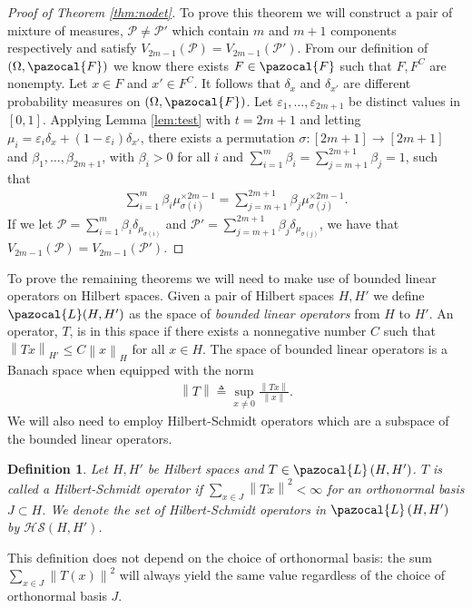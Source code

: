 \documentclass[aos,preprint]{imsart}
\def\l{\left}
\def\r{\right}
\def\sF{\pazocal{F}}
\def\sP{\mathscr{P}}
\def\sL{\pazocal{L}}
\def\hs{\mathscr{HS}}
\theoremstyle{plain}
\theoremstyle{defintion}
\newtheorem{defin}{Definition}[section]
\begin{document}
	\begin{proof}[Proof of Theorem \ref{thm:nodet}]
		To prove this theorem we will construct a pair of mixture of measures, $\sP \neq \sP'$ which contain $m$ and $m+1$ components respectively and satisfy $V_{2m-1}\left( \sP \right) = V_{2m-1}\left( \sP' \right)$. From our definition of $\left( \Omega, \sF \right)$ we know there exists $F\in \sF$ such that $F, F^C$ are nonempty. Let $x\in F$ and $x' \in F^C$. It follows that $\delta_{x}$ and $\delta_{x'}$ are different probability measures on $\left( \Omega, \sF \right)$.
		Let $\varepsilon_1,\ldots,\varepsilon_{2m+1}$ be distinct values in $\left[ 0,1 \right]$. Applying Lemma \ref{lem:test}  with $t=2m+1$ and letting $\mu_i = \varepsilon_i \delta_x + \left( 1-\varepsilon_i \right)\delta_{x'}$, there exists a permutation $\sigma:\left[ 2m+1 \right] \to \left[ 2m+1 \right]$ and $\beta_1,\ldots,\beta_{2m+1}$, with $\beta_i>0$ for all $i$ and $\sum_{i=1}^m \beta_i = \sum_{j=m+1}^{2m+1} \beta_j = 1$, such that
		\begin{eqnarray*}
			\sum_{i=1}^m \beta_i \mu_{\sigma\left( i \right)}^{\times 2m-1} = \sum_{j=m+1}^{2m+1} \beta_j \mu_{\sigma\left( j \right)}^{\times 2m-1}.
		\end{eqnarray*}
		If we let $\sP = \sum_{i=1}^m \beta_i \delta_{\mu_{\sigma\left( i \right)}}$ and $\sP' = \sum_{j=m+1}^{2m+1} \beta_j \delta_{\mu_{\sigma\left( j \right)}}$, we have that $V_{2m-1}\left( \sP \right)= V_{2m-1}\left( \sP' \right)$.
	\end{proof}
	To prove the remaining theorems we will need to make use of bounded linear operators on Hilbert spaces. Given a pair of Hilbert spaces $H,H'$ we define $\sL(H,H')$ as the space of {\em bounded linear operators} from $H$ to $H'$. An operator, $T$, is in this space if there exists a nonnegative number $C$ such that $\l\|Tx\r\|_{H'}\le C\l\|x\r\|_{H}$ for all $x \in H$. The space of bounded linear operators is a Banach space when equipped with the norm 
	\begin{eqnarray*}
		\l\|T\r\| \triangleq \sup_{x\neq 0}\frac{\l\|Tx\r\|}{\l\|x\r\|}.
	\end{eqnarray*}
	We will also need to employ Hilbert-Schmidt operators which are a subspace of the bounded linear operators.
	\begin{defin} \label{def:hs}
		Let $H,H'$ be Hilbert spaces and $T\in \sL\left( H,H' \right)$. $T$ is called a {\em Hilbert-Schmidt operator} if $\sum_{x\in J} \l\|T x \r\|^2 < \infty$ for an orthonormal basis $J\subset H$. We denote the set of Hilbert-Schmidt operators in $\sL\left( H,H' \right)$ by $\hs\left( H,H' \right)$.
	\end{defin}
	This definition does not depend on the choice of orthonormal basis: the sum $\sum_{x\in J} \l\|T\left( x \right)\r\|^2$ will always yield the same value regardless of the choice of orthonormal basis $J$. 
\end{document}
